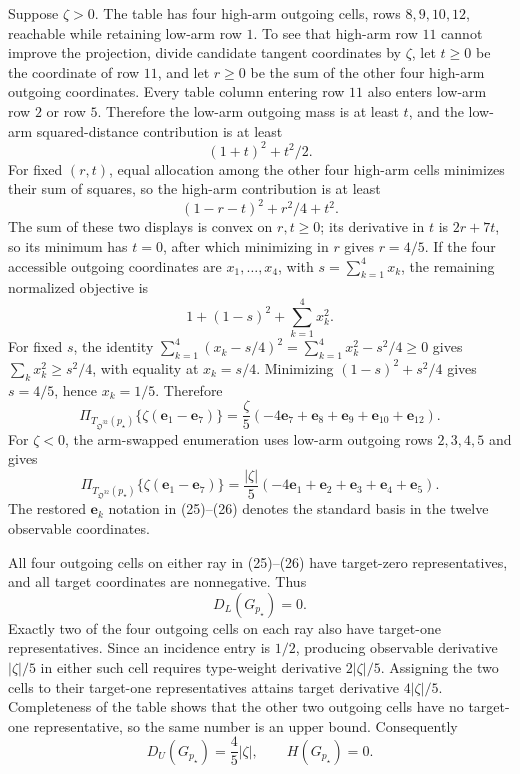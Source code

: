 Suppose \(\zeta>0\).  The table has four high-arm outgoing cells, rows \(8,9,10,12\), reachable while retaining low-arm row \(1\).  To see that high-arm row \(11\) cannot improve the projection, divide candidate tangent coordinates by \(\zeta\), let \(t\geq0\) be the coordinate of row \(11\), and let \(r\geq0\) be the sum of the other four high-arm outgoing coordinates.  Every table column entering row \(11\) also enters low-arm row \(2\) or row \(5\).  Therefore the low-arm outgoing mass is at least \(t\), and the low-arm squared-distance contribution is at least
\[
(1+t)^2+t^2/2.
\]
For fixed \((r,t)\), equal allocation among the other four high-arm cells minimizes their sum of squares, so the high-arm contribution is at least
\[
(1-r-t)^2+r^2/4+t^2.
\]
The sum of these two displays is convex on \(r,t\geq0\); its derivative in \(t\) is \(2r+7t\), so its minimum has \(t=0\), after which minimizing in \(r\) gives \(r=4/5\).  If the four accessible outgoing coordinates are \(x_1,\ldots,x_4\), with \(s=\sum_{k=1}^4x_k\), the remaining normalized objective is
\[
1+(1-s)^2+\sum_{k=1}^4x_k^2.
\]
For fixed \(s\), the identity \(\sum_{k=1}^4(x_k-s/4)^2=\sum_{k=1}^4x_k^2-s^2/4\geq0\) gives \(\sum_kx_k^2\geq s^2/4\), with equality at \(x_k=s/4\).  Minimizing \((1-s)^2+s^2/4\) gives \(s=4/5\), hence \(x_k=1/5\).  Therefore
\[
\Pi_{T_{\mathfrak O^{32}}(p_\star)}
\{\zeta(\mathbf e_1-\mathbf e_7)\}
=\frac{\zeta}{5}(-4\mathbf e_7+\mathbf e_8+\mathbf e_9+\mathbf e_{10}+\mathbf e_{12}).
\tag{25}
\]
For \(\zeta<0\), the arm-swapped enumeration uses low-arm outgoing rows \(2,3,4,5\) and gives
\[
\Pi_{T_{\mathfrak O^{32}}(p_\star)}
\{\zeta(\mathbf e_1-\mathbf e_7)\}
=\frac{|\zeta|}{5}(-4\mathbf e_1+\mathbf e_2+\mathbf e_3+\mathbf e_4+\mathbf e_5).
\tag{26}
\]
The restored \(\mathbf e_k\) notation in (25)--(26) denotes the standard basis in the twelve observable coordinates.

All four outgoing cells on either ray in (25)--(26) have target-zero representatives, and all target coordinates are nonnegative.  Thus
\[
D_L(G_{p_\star})=0.
\tag{27}
\]
Exactly two of the four outgoing cells on each ray also have target-one representatives.  Since an incidence entry is \(1/2\), producing observable derivative \(|\zeta|/5\) in either such cell requires type-weight derivative \(2|\zeta|/5\).  Assigning the two cells to their target-one representatives attains target derivative \(4|\zeta|/5\).  Completeness of the table shows that the other two outgoing cells have no target-one representative, so the same number is an upper bound.  Consequently
\[
D_U(G_{p_\star})=\frac45|\zeta|,
\qquad H(G_{p_\star})=0.
\tag{28}
\]

